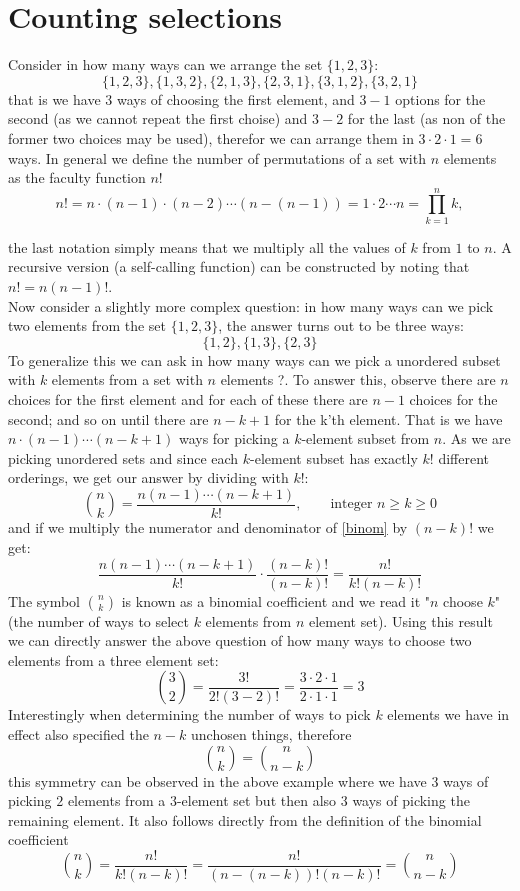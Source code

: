 \section{Counting selections}
Consider in how many ways can we arrange the set $\{1,2,3\}$:
\[
\{1, 2, 3\}, \{1, 3, 2\}, \{2, 1, 3\}, \{2, 3, 1\}, \{3, 1, 2\}, \{3, 2, 1\}
\]
that is we have $3$ ways of choosing the first element, and $3-1$ options for the second (as we cannot repeat the first choise) and $3-2$ for the last (as non of the former two choices may be used), therefor we can arrange them in $3 \cdot 2 \cdot 1 = 6$ ways. In general we define the number of permutations of a set with $n$ elements as the faculty function $n!$
\[
n! = n \cdot (n-1) \cdot (n-2) \cdots  (n - (n -1)) = 1 \cdot 2 \cdots n = \prod_{k=1}^{n}k,
\]

the last notation simply means that we multiply all the values of $k$ from $1$ to $n$. A recursive version (a self-calling function) can be constructed by noting that $n! = n(n-1)!$. \\

\myindent Now consider a slightly more complex question: in how many ways can we pick two elements from the set $\{1,2,3\}$, the answer turns out to be three ways:
\[
\{1, 2\}, \{1, 3\}, \{2, 3\}
\]
To generalize this we can ask in how many ways can we pick a unordered subset with $k$ elements from a set with $n$ elements ?. To answer this, observe there are $n$ choices for the first element and for each of these there are $n - 1$ choices for the second; and so on until there are $n - k + 1$ for the k'th element. That is we have $n \cdot (n-1) \cdots (n - k + 1)$ ways for picking a $k$-element subset from $n$. As we are picking unordered sets and since each $k$-element subset has exactly $k!$ different orderings, we get our answer by dividing with $k!$:
\begin{equation}\label{binom}
\binom{n}{k} = \frac{n(n-1) \cdots (n - k + 1)}{k!},  \qquad \text{integer } n \geq k \geq 0
\end{equation}
and if we multiply the numerator and denominator of \ref{binom} by $(n - k)!$ we get:
\[
\frac{n(n-1) \cdots (n - k + 1)}{k!} \cdot \frac{(n - k)!}{(n - k)!} =  \frac{n!}{k!(n-k)!}
\]
The symbol $\binom{n}{k}$ is known as a binomial coefficient and we read it "$n$ choose $k$" (the number of ways to select $k$ elements from $n$ element set). Using this result we can directly answer the above question of how many ways to choose two elements from a three element set:
\[
\binom{3}{2}  = \frac{3!}{2! (3-2)!} = \frac{3 \cdot 2 \cdot 1}{2 \cdot 1 \cdot 1} = 3
\]
Interestingly when determining the number of ways to pick $k$ elements we have in effect also specified the $n-k$ unchosen things, therefore
\begin{equation}\label{binom_symmetry}
\binom{n}{k} = \binom{n}{n-k}
\end{equation}
this symmetry can be observed in the above example where we have $3$ ways of picking $2$ elements from a $3$-element set but then also $3$ ways of picking the remaining element. It also follows directly from the definition of the binomial coefficient
\[
\binom{n}{k} =  \frac{n!}{k!(n-k)!} =  \frac{n!}{(n-(n-k))!(n-k)!} = \binom{n}{n-k}
\]

